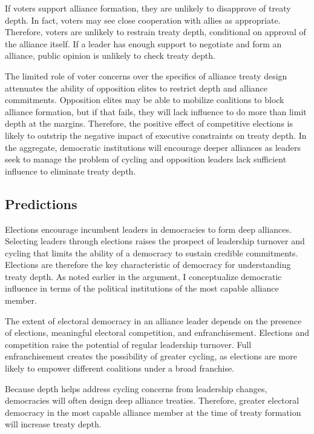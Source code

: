 \documentclass[12pt]{article}
\begin{document}
If voters support alliance formation, they are unlikely to disapprove of treaty depth.
In fact, voters may see close cooperation with allies as appropriate. 
Therefore, voters are unlikely to restrain treaty depth, conditional on approval of the alliance itself. 
If a leader has enough support to negotiate and form an alliance, public opinion is unlikely to check treaty depth. 


The limited role of voter concerns over the specifics of alliance treaty design attenuates the ability of opposition elites to restrict depth and alliance commitments.
Opposition elites may be able to mobilize coalitions to block alliance formation, but if that fails, they will lack influence to do more than limit depth at the margins. 
Therefore, the positive effect of competitive elections is likely to outstrip the negative impact of executive constraints on treaty depth.
In the aggregate, democratic institutions will encourage deeper alliances as leaders seek to manage the problem of cycling and opposition leaders lack sufficient influence to eliminate treaty depth.  



\subsection{Predictions}

Elections encourage incumbent leaders in democracies to form deep alliances.
Selecting leaders through elections raises the prospect of leadership turnover and cycling that limits the ability of a democracy to sustain credible commitments. 
Elections are therefore the key characteristic of democracy for understanding treaty depth. 
As noted earlier in the argument, I conceptualize democratic influence in terms of the political institutions of the most capable alliance member.


The extent of electoral democracy in an alliance leader depends on the presence of elections, meaningful electoral competition, and enfranchisement. 
Elections and competition raise the potential of regular leadership turnover. 
Full enfranchisement creates the possibility of greater cycling, as elections are more likely to empower different coalitions under a broad franchise. 


Because depth helps address cycling concerns from leadership changes, democracies will often design deep alliance treaties. 
Therefore, greater electoral democracy in the most capable alliance member at the time of treaty formation will increase treaty depth. 
\end{document}
